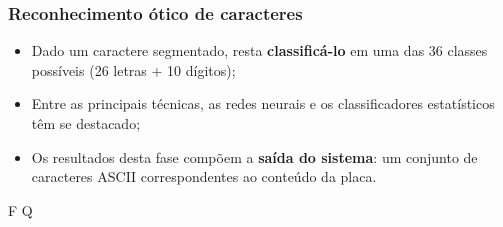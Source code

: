 \begin{frame}
	\frametitle{Reconhecimento ótico de caracteres}
	\begin{itemize}
		\item Dado um caractere segmentado, resta \textbf{classificá-lo}
			em uma das 36 classes possíveis (26 letras + 10 dígitos);
		\item Entre as principais técnicas, as redes neurais e os
			classificadores estatísticos têm se destacado;
		\item Os resultados desta fase compõem a \textbf{saída do sistema}: um conjunto
			de caracteres ASCII correspondentes ao conteúdo
			da placa.
	\end{itemize}
	
	\begin{center}
	\Huge {\rmfamily F \qquad Q}
	\end{center}

\end{frame}

